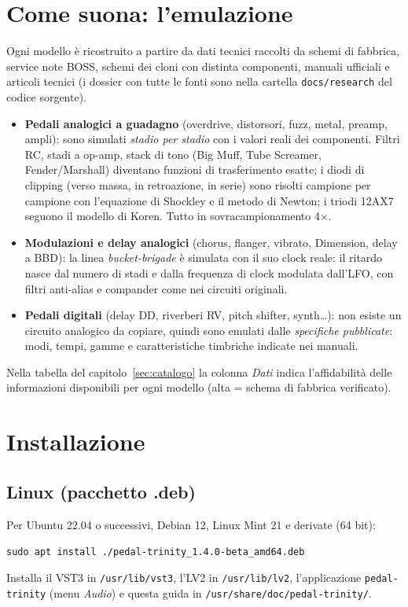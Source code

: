 \documentclass[11pt,a4paper]{article}
\begin{document}
\section{Come suona: l'emulazione}
Ogni modello è ricostruito a partire da dati tecnici raccolti da schemi di fabbrica, service note BOSS,
schemi dei cloni con distinta componenti, manuali ufficiali e articoli tecnici (i dossier con tutte le
fonti sono nella cartella \texttt{docs/research} del codice sorgente).
\begin{itemize}
  \item \textbf{Pedali analogici a guadagno} (overdrive, distorsori, fuzz, metal, preamp, ampli):
        sono simulati \emph{stadio per stadio} con i valori reali dei componenti. Filtri RC, stadi a
        op-amp, stack di tono (Big Muff, Tube Screamer, Fender/Marshall) diventano funzioni di
        trasferimento esatte; i diodi di clipping (verso massa, in retroazione, in serie) sono risolti
        campione per campione con l'equazione di Shockley e il metodo di Newton; i triodi 12AX7 seguono
        il modello di Koren. Tutto in sovracampionamento 4×.
  \item \textbf{Modulazioni e delay analogici} (chorus, flanger, vibrato, Dimension, delay a BBD):
        la linea \emph{bucket-brigade} è simulata con il suo clock reale: il ritardo nasce dal numero
        di stadi e dalla frequenza di clock modulata dall'LFO, con filtri anti-alias e compander come
        nei circuiti originali.
  \item \textbf{Pedali digitali} (delay DD, riverberi RV, pitch shifter, synth\dots): non esiste un
        circuito analogico da copiare, quindi sono emulati dalle \emph{specifiche pubblicate}: modi,
        tempi, gamme e caratteristiche timbriche indicate nei manuali.
\end{itemize}
Nella tabella del capitolo~\ref{sec:catalogo} la colonna \emph{Dati} indica l'affidabilità delle
informazioni disponibili per ogni modello (alta = schema di fabbrica verificato).

\section{Installazione}
\subsection{Linux (pacchetto .deb)}
Per Ubuntu 22.04 o successivi, Debian 12, Linux Mint 21 e derivate (64 bit):
\begin{tcolorbox}[colback=charcoal,colupper=white,boxrule=0pt,arc=2mm]
\texttt{sudo apt install ./pedal-trinity\_1.4.0-beta\_amd64.deb}
\end{tcolorbox}
Installa il VST3 in \texttt{/usr/lib/vst3}, l'LV2 in \texttt{/usr/lib/lv2}, l'applicazione
\texttt{pedal-trinity} (menu \emph{Audio}) e questa guida in \texttt{/usr/share/doc/pedal-trinity/}.
\end{document}
